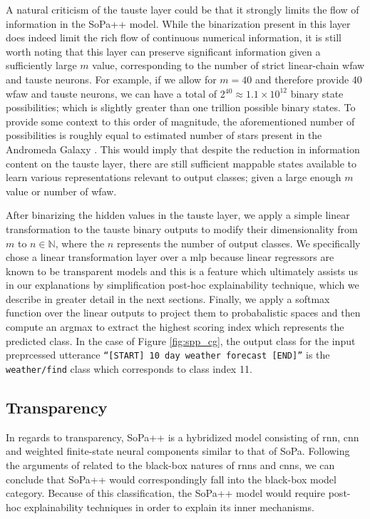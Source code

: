 A natural criticism of the \ac{tauste} layer could be that it strongly limits
the flow of information in the SoPa++ model. While the binarization present in
this layer does indeed limit the rich flow of continuous numerical information,
it is still worth noting that this layer can preserve significant information
given a sufficiently large $m$ value, corresponding to the number of strict
linear-chain \ac{wfaw} and \ac{tauste} neurons. For example, if we allow for
$m=40$ and therefore provide 40 \ac{wfaw} and \ac{tauste} neurons, we can have a
total of 2$^{40}\approx1.1\times10^{12}$ binary state possibilities; which is
slightly greater than one trillion possible binary states. To provide some
context to this order of magnitude, the aforementioned number of possibilities
is roughly equal to estimated number of stars present in the Andromeda Galaxy
\citep{10.1093/mnras/stu879}. This would imply that despite the reduction in
information content on the \ac{tauste} layer, there are still sufficient
mappable states available to learn various representations relevant to output
classes; given a large enough $m$ value or number of \ac{wfaw}.

After binarizing the hidden values in the \ac{tauste} layer, we apply a simple linear
transformation to the \ac{tauste} binary outputs to modify their dimensionality from
$m$ to $n \in \mathbb{N}$, where the $n$ represents the number of output
classes. We specifically chose a linear transformation layer over a \ac{mlp} because
linear regressors are known to be transparent models
\citep{arrieta2020explainable} and this is a feature which ultimately assists us
in our explanations by simplification post-hoc explainability technique, which
we describe in greater detail in the next sections. Finally, we apply a softmax
function over the linear outputs to project them to probabalistic spaces and
then compute an argmax to extract the highest scoring index which represents the
predicted class. In the case of Figure \ref{fig:spp_cg}, the output class for
the input preprcessed utterance \texttt{``[START] 10 day weather forecast
  [END]''} is the \texttt{weather/find} class which corresponds to class index 11.

\subsection{Transparency}

\label{section:spp_transparency}

In regards to transparency, SoPa++ is a hybridized model consisting of \ac{rnn},
\ac{cnn} and weighted finite-state neural components similar to that of SoPa.
Following the arguments of \citet{arrieta2020explainable} related to the
black-box natures of \ac{rnn}s and \ac{cnn}s, we can conclude that SoPa++ would
correspondingly fall into the black-box model category. Because of this
classification, the SoPa++ model would require post-hoc explainability
techniques in order to explain its inner mechanisms.

